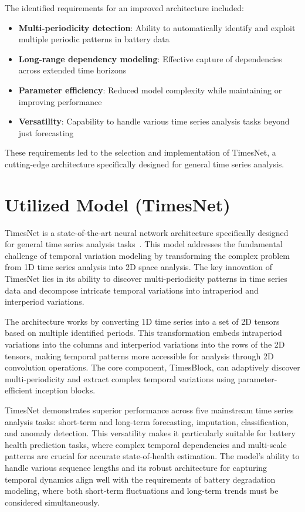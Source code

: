 The identified requirements for an improved architecture included:

\begin{itemize}
    \item \textbf{Multi-periodicity detection}: Ability to automatically identify and exploit multiple periodic patterns in battery data
    \item \textbf{Long-range dependency modeling}: Effective capture of dependencies across extended time horizons
    \item \textbf{Parameter efficiency}: Reduced model complexity while maintaining or improving performance
    \item \textbf{Versatility}: Capability to handle various time series analysis tasks beyond just forecasting
\end{itemize}

These requirements led to the selection and implementation of TimesNet, a cutting-edge architecture specifically designed for general time series analysis.

\section{Utilized Model (TimesNet)}

TimesNet is a state-of-the-art neural network architecture specifically designed for general time series analysis tasks~\cite{wu_timesnet_2023}. This model addresses the fundamental challenge of temporal variation modeling by transforming the complex problem from 1D time series analysis into 2D space analysis. The key innovation of TimesNet lies in its ability to discover multi-periodicity patterns in time series data and decompose intricate temporal variations into intraperiod and interperiod variations.

The architecture works by converting 1D time series into a set of 2D tensors based on multiple identified periods. This transformation embeds intraperiod variations into the columns and interperiod variations into the rows of the 2D tensors, making temporal patterns more accessible for analysis through 2D convolution operations. The core component, TimesBlock, can adaptively discover multi-periodicity and extract complex temporal variations using parameter-efficient inception blocks.

TimesNet demonstrates superior performance across five mainstream time series analysis tasks: short-term and long-term forecasting, imputation, classification, and anomaly detection. This versatility makes it particularly suitable for battery health prediction tasks, where complex temporal dependencies and multi-scale patterns are crucial for accurate state-of-health estimation. The model's ability to handle various sequence lengths and its robust architecture for capturing temporal dynamics align well with the requirements of battery degradation modeling, where both short-term fluctuations and long-term trends must be considered simultaneously.


